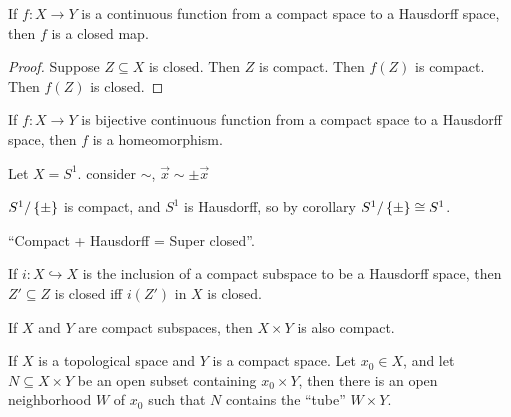 \documentclass[12pt, twosided]{article}
\begin{document}
\begin{cor}
  If \(f:X \to Y\) is a continuous function from a compact space to a Hausdorff space, then \(f\) is a closed map.
\end{cor}

\begin{proof}
  Suppose \(Z \subseteq X\) is closed. Then \(Z\) is compact. Then \(f(Z)\) is compact. Then \(f(Z)\) is closed.
\end{proof}
\begin{cor}
  If \(f:X \to Y\) is bijective continuous function from a compact space to a Hausdorff space, then \(f\) is a homeomorphism.
\end{cor}

\begin{exa}
  Let \(X = S^1\). consider \(\sim\), \(\vec{x} \sim \pm \vec{x}\)

  \begin{center}
  \end{center}

  \(S^1/\left\{ \pm \right\}\) is compact, and \(S^1\) is Hausdorff, so by corollary \(S^1/\left\{ \pm \right\} \cong S^1\).
\end{exa}
\begin{framed}
  ``Compact + Hausdorff = Super closed''.

  If \(i: X \hookrightarrow X\) is the inclusion of a compact subspace to be a Hausdorff space, then \(Z\prime \subseteq Z\) is closed iff \(i(Z\prime)\) in \(X\) is closed.
\end{framed}
\begin{thm}
  If \(X\) and \(Y\) are compact subspaces, then \(X \times Y\) is also compact.
\end{thm}

\begin{lm}
  If \(X\) is a topological space and \(Y\) is a compact space. Let \(x_0 \in X\), and let \(N \subseteq X \times Y\) be an open subset containing \(x_0 \times Y\), then there is an open neighborhood \(W\) of \(x_0\) such that \(N\) contains the ``tube'' \(W \times Y\).
\end{lm}
\end{document}
